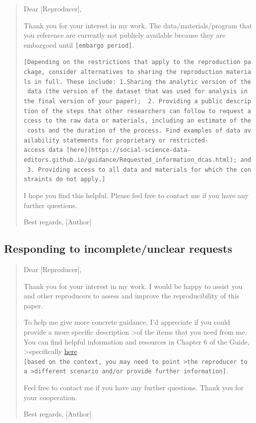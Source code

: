 \documentclass[
]{book}
\begin{document}
\begin{quote}
Dear {[}Reproducer{]},

Thank you for your interest in my work. The data/materials/program that you reference are currently not publicly available because they are embargoed until \texttt{{[}embargo\ period{]}}.

\texttt{{[}Depending\ on\ the\ restrictions\ that\ apply\ to\ the\ reproduction\ package,\ consider\ alternatives\ to\ sharing\ the\ reproduction\ materials\ in\ full.\ These\ include:\ 1.Sharing\ the\ analytic\ version\ of\ the\ data\ (the\ version\ of\ the\ dataset\ that\ was\ used\ for\ analysis\ in\ the\ final\ version\ of\ your\ paper);\ \ 2.\ Providing\ a\ public\ description\ of\ the\ steps\ that\ other\ researchers\ can\ follow\ to\ request\ access\ to\ the\ raw\ data\ or\ materials,\ including\ an\ estimate\ of\ the\ costs\ and\ the\ duration\ of\ the\ process.\ Find\ examples\ of\ data\ availability\ statements\ for\ proprietary\ or\ restricted-access\ data\ {[}here{]}(https://social-science-data-editors.github.io/guidance/Requested\_information\_dcas.html);\ and\ 3.\ Providing\ access\ to\ all\ data\ and\ materials\ for\ which\ the\ constraints\ do\ not\ apply.{]}}

I hope you find this helpful. Please feel free to contact me if you have any further questions.

Best regards,
{[}Author{]}
\end{quote}

\hypertarget{responding-to-incompleteunclear-requests}{%
\subsection{Responding to incomplete/unclear requests}\label{responding-to-incompleteunclear-requests}}

\begin{quote}
Dear {[}Reproducer{]},

Thank you for your interest in my work. I would be happy to assist you and other reproducers to assess and improve the reproducibility of this paper.

To help me give more concrete guidance, I'd appreciate if you could provide a more specific description \textgreater of the items that you need from me. You can find helpful information and resources in Chapter 6 of the Guide, \textgreater specifically \href{https://bitss.github.io/ACRE/guidance-for-a-constructive-exchange-between-reproducers-and-original-authors.html\#asking-for-additional-guidance-when-some-materials-have-been-shared}{here} \texttt{{[}based\ on\ the\ context,\ you\ may\ need\ to\ point\ \textgreater{}the\ reproducer\ to\ a\ \textgreater{}different\ scenario\ and/or\ provide\ further\ information{]}}.

Feel free to contact me if you have any further questions. Thank you for your cooperation.

Best regards,
{[}Author{]}
\end{quote}
\end{document}
